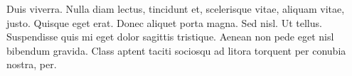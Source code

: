 \documentclass[
  a4paper,
  12pt,
  twoside
]{memoir}
\begin{document}
Duis viverra. Nulla diam lectus, tincidunt et, scelerisque vitae, aliquam vitae,
justo. Quisque eget erat. Donec aliquet porta magna. Sed nisl. Ut tellus.
Suspendisse quis mi eget dolor sagittis tristique. Aenean non pede eget nisl
bibendum gravida. Class aptent taciti sociosqu ad litora torquent per conubia
nostra, per.
\end{document}
